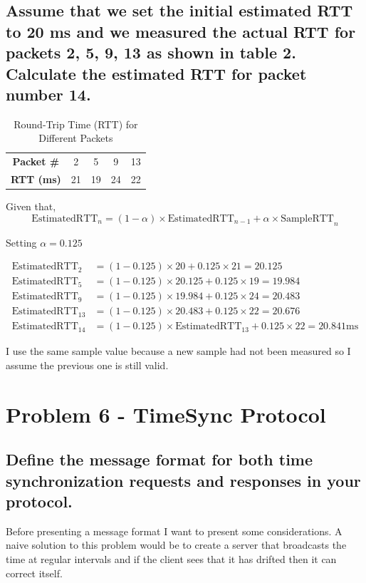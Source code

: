 \documentclass{article}
\begin{document}
\subsection{Assume that we set the initial estimated RTT to 20 ms and we measured the
actual RTT for packets 2, 5, 9, 13 as shown in table 2. Calculate the estimated RTT for
packet number 14.}

	\begin{table}[h]
		\centering
		\begin{tabular}{ccccc}
			\textbf{Packet \#} & 2  & 5  & 9  & 13 \\
			\textbf{RTT (ms)}  & 21 & 19 & 24 & 22 \\
		\end{tabular}
		\caption{Round-Trip Time (RTT) for Different Packets}
		\label{tab:rtt_data}
	\end{table}

	Given that,
	\[
		\text{EstimatedRTT}_n = (1 - \alpha) \times \text{EstimatedRTT}_{n-1} + \alpha \times \text{SampleRTT}_n
	\]

	Setting $\alpha=0.125$

	\[
		\begin{aligned}
			\text{EstimatedRTT}_2 &= (1 - 0.125) \times 20 + 0.125 \times 21 = 20.125 \\
			\text{EstimatedRTT}_5 &= (1 - 0.125) \times 20.125 + 0.125 \times 19 = 19.984 \\
			\text{EstimatedRTT}_9 &= (1 - 0.125) \times 19.984 + 0.125 \times 24 = 20.483 \\
			\text{EstimatedRTT}_{13} &= (1 - 0.125) \times 20.483 + 0.125 \times 22 = 20.676 \\
			\hline
			\text{EstimatedRTT}_{14} &= (1 - 0.125) \times \text{EstimatedRTT}_{13}  + 0.125 \times 22 = 20.841 \text{ms}
		\end{aligned}
	\]

	I use the same sample value because a new sample had not been measured so I assume the previous one is still valid.

\section{Problem 6 - TimeSync Protocol}

\subsection{Define the message format for both time synchronization requests and responses
in your protocol.}
		Before presenting a message format I want to present some considerations. A naive solution to this problem would be to create a 
		server that broadcasts the time at regular intervals and if the client sees that it has drifted then it can correct itself. \\
\end{document}
